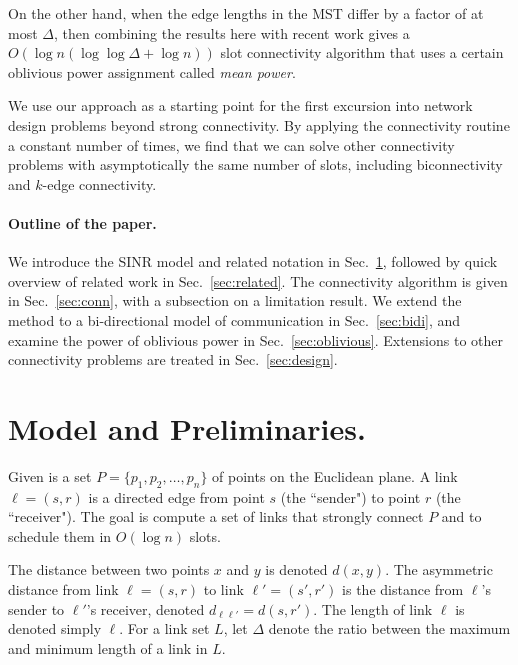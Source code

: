 \documentclass[11pt]{amsart}
\begin{document}
On the other hand, when the edge lengths in the MST differ by a factor
of at most $\Delta$, then combining the results here with recent work
\cite{SODA11} gives a $O(\log n (\log\log \Delta + \log n))$ slot
connectivity algorithm that uses a certain oblivious power assignment
called \emph{mean power}.



We use our approach as a starting point for the first excursion into
network design problems beyond strong connectivity.
By applying the connectivity routine a constant number of times, we
find that we can solve other connectivity problems with asymptotically
the same number of slots, including biconnectivity and $k$-edge
connectivity.


\paragraph{Outline of the paper.}
We introduce the SINR model and related notation in
Sec.~\ref{sec:model}, followed by quick overview of related work in Sec.~\ref{sec:related}.
The connectivity algorithm is given in Sec.~\ref{sec:conn},
with a subsection on a limitation result.
We extend the method to a bi-directional model
of communication in Sec.~\ref{sec:bidi}, and examine the power of oblivious
power in Sec.~\ref{sec:oblivious}.
Extensions to other connectivity problems are treated in Sec.~\ref{sec:design}.

\section{Model and Preliminaries.}
\label{sec:model}

Given is a set $P = \{p_1, p_2, \ldots, p_n\}$ of points on the Euclidean plane.
A link $\ell = (s, r)$ is a directed edge from point $s$ (the ``sender") to point $r$ (the ``receiver").
The goal is compute a set of links that strongly connect $P$ and to schedule them
in $O(\log n)$ slots.

The distance between two points $x$ and $y$ is denoted $d(x,y)$. The asymmetric distance from link $\ell = (s, r)$ to link $\ell' = (s', r')$ is the distance from
$\ell$'s sender to $\ell'$'s receiver, denoted $d_{\ell \ell'} = d(s, r')$. The length of link $\ell$ is denoted  simply $\ell$.
For a link set $L$, let $\Delta$ denote the ratio between the maximum and minimum length of a link in $L$.
\end{document}
